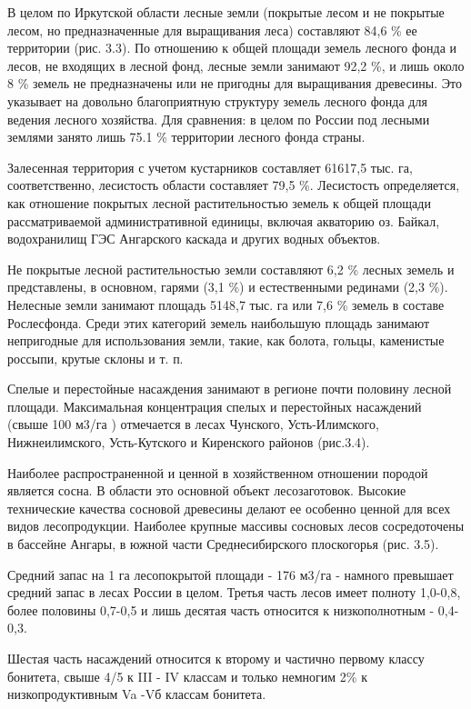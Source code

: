 \documentclass{report}
\begin{document}
В целом по Иркутской области лесные земли (покрытые лесом и не покрытые лесом, но предназначенные для выращивания леса)
составляют 84,6 \% ее территории (рис. 3.3). По отношению к общей площади земель лесного фонда и лесов, не входящих в
лесной фонд, лесные земли занимают 92,2 \%, и лишь около 8 \% земель не предназначены или не пригодны для выращивания
древесины. Это указывает на довольно благоприятную структуру земель лесного фонда для ведения лесного хозяйства. Для
сравнения: в целом по России под лесными землями занято лишь 75.1 \% территории лесного фонда страны.

Залесенная территория с учетом кустарников составляет 61617,5 тыс. га, соответственно, лесистость области составляет
79,5 \%. Лесистость определяется, как отношение покрытых лесной растительностью земель к общей площади рассматриваемой
административной единицы, включая акваторию оз. Байкал, водохранилищ ГЭС Ангарского каскада и других водных объектов.

Не покрытые лесной растительностью земли составляют 6,2 \% лесных земель и представлены, в основном, гарями (3,1 \%) и
естественными рединами (2,3 \%). Нелесные земли занимают площадь 5148,7 тыс. га или 7,6 \% земель в составе
Рослесфонда. Среди этих категорий земель наибольшую площадь занимают непригодные для использования земли, такие, как
болота, гольцы, каменистые россыпи, крутые склоны и т. п.

Спелые и перестойные насаждения занимают в регионе почти половину лесной площади. Максимальная концентрация спелых и
перестойных насаждений (свыше 100 м3/га ) отмечается в лесах Чунского, Усть-Илимского, Нижнеилимского, Усть-Кутского и
Киренского районов (рис.3.4).

Наиболее распространенной и ценной в хозяйственном отношении породой является сосна. В области это основной объект
лесозаготовок. Высокие технические качества сосновой древесины делают ее особенно ценной для всех видов лесопродукции.
Наиболее крупные массивы сосновых лесов сосредоточены в бассейне Ангары, в южной части Среднесибирского плоскогорья
(рис. 3.5).

Средний запас на 1 га лесопокрытой площади - 176 м3/га - намного превышает средний запас в лесах России в целом. Третья
часть лесов имеет полноту 1,0-0,8, более половины 0,7-0,5 и лишь десятая часть относится к низкополнотным - 0,4-0,3.

Шестая часть насаждений относится к второму и частично первому классу бонитета, свыше 4/5 к III - IV классам и только
немногим 2\% к низкопродуктивным Va -Vб классам бонитета. 
\end{document}
